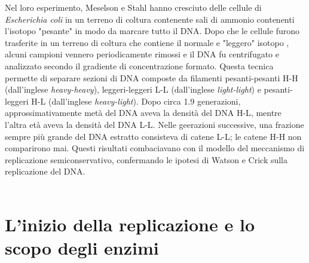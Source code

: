 \documentclass[11pt]{report}
\begin{document}
	Nel loro esperimento, Meselson e Stahl hanno cresciuto delle cellule di \textit{Escherichia coli} in un terreno di coltura contenente sali di ammonio contenenti l'isotopo "pesante"  in modo da marcare tutto il DNA. Dopo che le cellule furono trasferite in un terreno di coltura che contiene il normale e "leggero" isotopo , alcuni campioni vennero periodicamente rimossi e il DNA fu centrifugato e analizzato secondo il gradiente di concentrazione formato. Questa tecnica permette di separare sezioni di DNA composte da filamenti pesanti-pesanti H-H (dall'inglese \textit{heavy-heavy}), leggeri-leggeri L-L (dall'inglese \textit{light-light}) e pesanti-leggeri H-L (dall'inglese \textit{heavy-light}). Dopo circa 1.9 generazioni, approssimativamente metà del DNA aveva la densità del DNA H-L, mentre l'altra età aveva la densità del DNA L-L. Nelle geerazioni successive, una frazione sempre più grande del DNA estratto consisteva di catene L-L; le catene H-H non comparirono mai. Questi risultati combaciavano con il modello del meccanismo di replicazione semiconservativo, confermando le ipotesi di Watson e Crick sulla replicazione del DNA.\cite{meselson1958replication}\\
	\\
	
	\section{L'inizio della replicazione e lo scopo degli enzimi}
	
\end{document}
